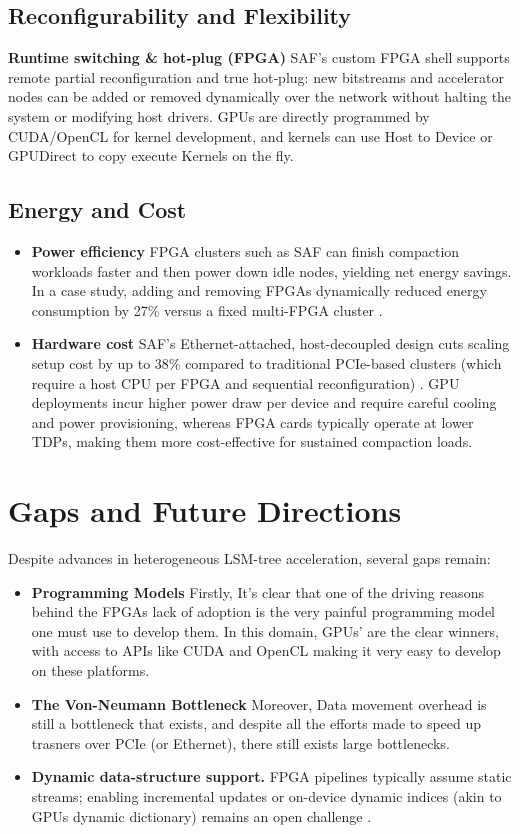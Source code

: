 \documentclass[sigconf]{acmart}
\begin{document}
  \subsection{Reconfigurability and Flexibility}
      \textbf{Runtime switching \& hot‐plug (FPGA)}  
      SAF’s custom FPGA shell supports remote partial reconfiguration and true hot‐plug: new bitstreams and accelerator nodes can be added or removed dynamically over the network without halting the system or modifying host drivers. 
      GPUs are directly programmed by CUDA/OpenCL for kernel development, and kernels can use Host to Device or GPUDirect to copy execute Kernels on the fly.

    \subsection{Energy and Cost}
    \begin{itemize}
      \item \textbf{Power efficiency}  
        FPGA clusters such as SAF can finish compaction workloads faster and then power down idle nodes, yielding net energy savings.  In a case study, adding and removing FPGAs dynamically reduced energy consumption by 27\% versus a fixed multi-FPGA cluster \cite{quraishi2025saf}.
      \item \textbf{Hardware cost}  
        SAF's Ethernet-attached, host-decoupled design cuts scaling setup cost by up to 38\% compared to traditional PCIe-based clusters (which require a host CPU per FPGA and sequential reconfiguration) \cite{quraishi2025saf}.  
        GPU deployments incur higher power draw per device and require careful cooling and power provisioning, whereas FPGA cards typically operate at lower TDPs, making them more cost-effective for sustained compaction loads.
    \end{itemize}

\section{Gaps and Future Directions}
    \label{sec:future}
    Despite advances in heterogeneous LSM-tree acceleration, several gaps remain:
    \begin{itemize}
      \item \textbf{Programming Models}
        Firstly, It's clear that one of the driving reasons behind the FPGAs lack of adoption is the very painful programming model one must use to develop them. In this domain, GPUs' are the clear winners, with access to APIs like CUDA and OpenCL making it very easy to develop on these platforms.
        \item \textbf{The Von-Neumann Bottleneck}
        Moreover, Data movement overhead is still a bottleneck that  exists, and despite all the efforts made to speed up trasners over PCIe (or Ethernet), there still exists large bottlenecks. 
      \item \textbf{Dynamic data-structure support.}  
        FPGA pipelines typically assume static streams; enabling incremental updates or on-device dynamic indices (akin to GPUs dynamic dictionary) remains an open challenge \cite{peng2024lsm}.
    \end{itemize}
\end{document}
